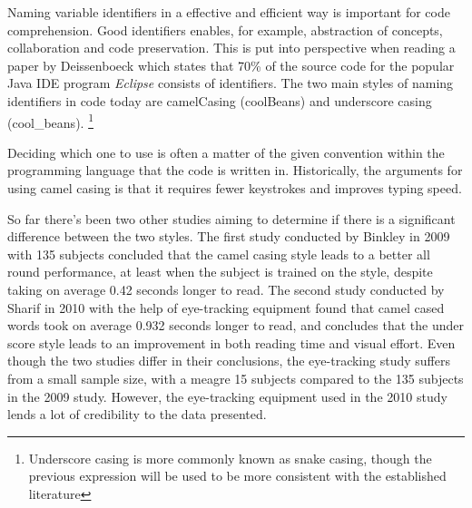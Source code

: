 \iffalse
\begin{itemize}
	\item Identifier names are important
	\item We have two identifier styles
	\item Some history 
	\item Two other studies
	\item Some background on them
	\item Reference all terms introduced
\end{itemize}
\fi

Naming variable identifiers in a effective and efficient way is important for code comprehension. Good identifiers enables, for example, abstraction of concepts, collaboration and code preservation. This is put into perspective when reading a paper by Deissenboeck \etal \cite{Concise-Naming} which states that 70\% of the source code for the popular Java IDE program \textit{Eclipse} consists of identifiers. The two main styles of naming identifiers in code today are camelCasing (\eg coolBeans) and underscore casing (\eg cool\_beans). \footnote{Underscore casing is more commonly known as snake casing, though the previous expression will be used to be more consistent with the established literature}

Deciding which one to use is often a matter of the given convention within the programming language that the code is written in. Historically, the arguments for using camel casing is that it requires fewer keystrokes and improves typing speed. 

So far there's been two other studies aiming to determine if there is a significant difference between the two styles. The first study conducted by Binkley \etal in 2009 \cite{to-camelCase-or-under-score} with 135 subjects concluded that the camel casing style leads to a better all round performance, at least when the subject is trained on the style, despite taking on average 0.42 seconds longer to read. The second study conducted by Sharif \etal in 2010 \cite{eye-tracking-study} with the help of eye-tracking equipment found that camel cased words took on average 0.932 seconds longer to read, and concludes that the under score style leads to an improvement in both reading time and visual effort. Even though the two studies differ in their conclusions, the eye-tracking study suffers from a small sample size, with a meagre 15 subjects compared to the 135 subjects in the 2009 study. However, the eye-tracking equipment used in the 2010 study lends a lot of credibility to the data presented.

